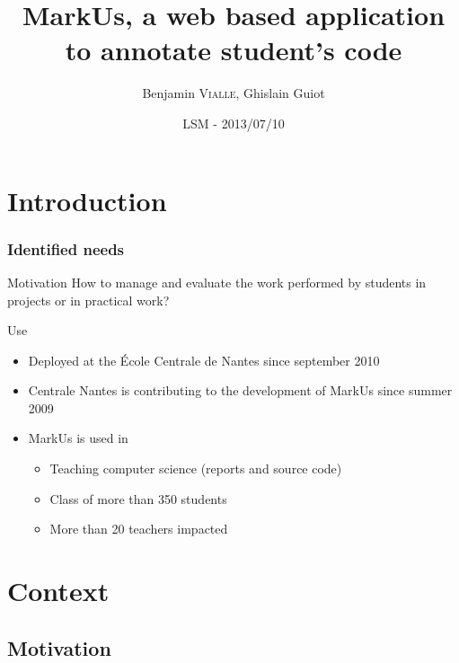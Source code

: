 \documentclass[svgnames,hyperref, english, xcolor=dvipsnames,usenames]{beamer}					      %
\title[MarkUs]%
{MarkUs, a web based application to annotate student's code}
\author[B. \textsc{Vialle}, G. \textsc{Guiot}]%
{Benjamin \textsc{Vialle}, Ghislain Guiot}
\institute[ECN]{\structure{École Centrale de Nantes}}
\date[2013-07-10]{LSM - 2013/07/10}
\begin{document}
\frame{\titlepage}


\section{Introduction}

\frame
{
        \frametitle{Identified needs}

        \begin{alertblock}{Motivation}
                How to manage and evaluate the work performed by students in projects or in practical work?
        \end{alertblock}

        \begin{block}{Use}
                \begin{itemize}
                        \item Deployed at the École Centrale de Nantes since september 2010
                        \item Centrale Nantes is contributing to the development of MarkUs since summer 2009
                        \item MarkUs is used in
                                \begin{itemize}
                                        \item Teaching computer science (reports and source code)
                                        \item Class of more than 350 students
                                        \item More than 20 teachers impacted
                                \end{itemize}
                \end{itemize}
        \end{block}
}


\section{Context}

\subsection*{Motivation}
\end{document}

